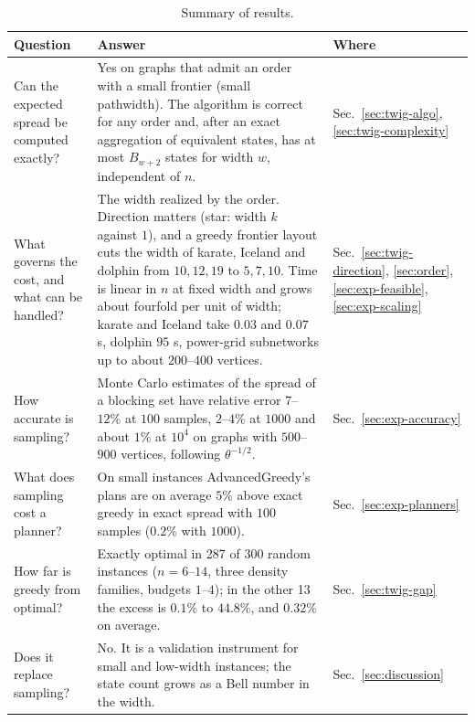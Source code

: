 \documentclass[preprint,11pt]{elsarticle}
\theoremstyle{definition}
\theoremstyle{remark}
\newcommand{\up}{\rule{0pt}{2.6ex}}
\begin{document}
\begin{table}[h]
\centering
\caption{Summary of results.}\label{tab:summary}
\small
\begin{tabular}{@{}p{}p{}p{}@{}}
\hline
\up Question & Answer & Where \\
\hline
\up Can the expected spread be computed exactly? & Yes on graphs that admit an order with a small frontier (small pathwidth). The algorithm is correct for any order and, after an exact aggregation of equivalent states, has at most $B_{w+2}$ states for width $w$, independent of $n$. & Sec.~\ref{sec:twig-algo}, \ref{sec:twig-complexity} \\
What governs the cost, and what can be handled? & The width realized by the order. Direction matters (star: width $k$ against $1$), and a greedy frontier layout cuts the width of karate, Iceland and dolphin from $10,12,19$ to $5,7,10$. Time is linear in $n$ at fixed width and grows about fourfold per unit of width; karate and Iceland take $0.03$ and $0.07$ s, dolphin $95$ s, power-grid subnetworks up to about $200$--$400$ vertices. & Sec.~\ref{sec:twig-direction}, \ref{sec:order}, \ref{sec:exp-feasible}, \ref{sec:exp-scaling} \\
How accurate is sampling? & Monte Carlo estimates of the spread of a blocking set have relative error $7$--$12\%$ at $100$ samples, $2$--$4\%$ at $1000$ and about $1\%$ at $10^4$ on graphs with $500$--$900$ vertices, following $\theta^{-1/2}$. & Sec.~\ref{sec:exp-accuracy} \\
What does sampling cost a planner? & On small instances AdvancedGreedy's plans are on average $5\%$ above exact greedy in exact spread with $100$ samples ($0.2\%$ with $1000$). & Sec.~\ref{sec:exp-planners} \\
How far is greedy from optimal? & Exactly optimal in 287 of 300 random instances ($n=6$--$14$, three density families, budgets $1$--$4$); in the other 13 the excess is $0.1\%$ to $44.8\%$, and $0.32\%$ on average. & Sec.~\ref{sec:twig-gap} \\
Does it replace sampling? & No. It is a validation instrument for small and low-width instances; the state count grows as a Bell number in the width. & Sec.~\ref{sec:discussion} \\
\hline
\end{tabular}
\end{table}
\end{document}
